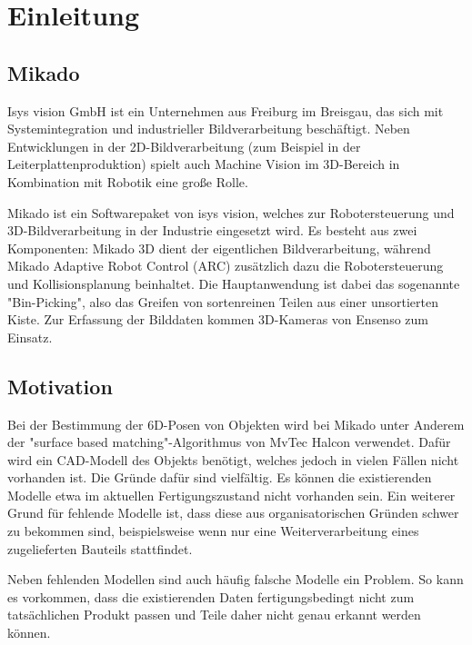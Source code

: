 
\chapter{Einleitung}

\section{Mikado}

Isys vision GmbH \cite{isys} ist ein Unternehmen aus Freiburg im Breisgau, das sich mit Systemintegration und industrieller Bildverarbeitung beschäftigt.
Neben Entwicklungen in der 2D-Bildverarbeitung (zum Beispiel in der Leiterplattenproduktion) spielt auch Machine Vision im 3D-Bereich in Kombination mit Robotik eine große Rolle.


Mikado \cite{mikado} ist ein Softwarepaket von isys vision, welches zur Robotersteuerung und 3D-Bildverarbeitung in der Industrie eingesetzt wird.
Es besteht aus zwei Komponenten: Mikado 3D dient der eigentlichen Bildverarbeitung, während Mikado Adaptive Robot Control (ARC) zusätzlich dazu die Robotersteuerung und Kollisionsplanung beinhaltet.
Die Hauptanwendung ist dabei das sogenannte "Bin-Picking", also das Greifen von sortenreinen Teilen aus einer unsortierten Kiste.
Zur Erfassung der Bilddaten kommen 3D-Kameras von Ensenso \cite{ensenso} zum Einsatz.


\section{Motivation}

Bei der Bestimmung der 6D-Posen von Objekten wird bei Mikado unter Anderem der "surface based matching"-Algorithmus von MvTec Halcon \cite{drost2014recognition} verwendet.
Dafür wird ein CAD-Modell des Objekts benötigt, welches jedoch in vielen Fällen nicht vorhanden ist.
Die Gründe dafür sind vielfältig.
Es können die existierenden Modelle etwa im aktuellen Fertigungszustand nicht vorhanden sein.
Ein weiterer Grund für fehlende Modelle ist, dass diese aus organisatorischen Gründen schwer zu bekommen sind, beispielsweise wenn nur eine Weiterverarbeitung eines zugelieferten Bauteils stattfindet.

Neben fehlenden Modellen sind auch häufig falsche Modelle ein Problem.
So kann es vorkommen, dass die existierenden Daten fertigungsbedingt nicht zum tatsächlichen Produkt passen und Teile daher nicht genau erkannt werden können.


